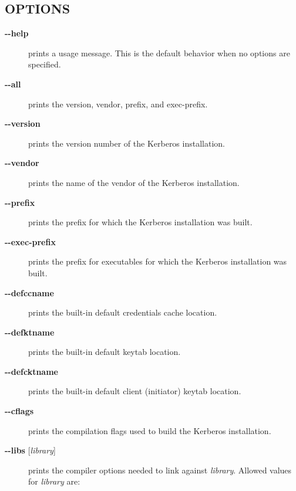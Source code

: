 \documentclass[letterpaper,10pt,english]{sphinxmanual}
\begin{document}
\subsection{OPTIONS}
\label{user/user_commands/krb5-config:options}\begin{description}
\item[{\textbf{-}\textbf{-help}}] \leavevmode
prints a usage message.  This is the default behavior when no options
are specified.

\item[{\textbf{-}\textbf{-all}}] \leavevmode
prints the version, vendor, prefix, and exec-prefix.

\item[{\textbf{-}\textbf{-version}}] \leavevmode
prints the version number of the Kerberos installation.

\item[{\textbf{-}\textbf{-vendor}}] \leavevmode
prints the name of the vendor of the Kerberos installation.

\item[{\textbf{-}\textbf{-prefix}}] \leavevmode
prints the prefix for which the Kerberos installation was built.

\item[{\textbf{-}\textbf{-exec-prefix}}] \leavevmode
prints the prefix for executables for which the Kerberos installation
was built.

\item[{\textbf{-}\textbf{-defccname}}] \leavevmode
prints the built-in default credentials cache location.

\item[{\textbf{-}\textbf{-defktname}}] \leavevmode
prints the built-in default keytab location.

\item[{\textbf{-}\textbf{-defcktname}}] \leavevmode
prints the built-in default client (initiator) keytab location.

\item[{\textbf{-}\textbf{-cflags}}] \leavevmode
prints the compilation flags used to build the Kerberos installation.

\item[{\textbf{-}\textbf{-libs} {[}\emph{library}{]}}] \leavevmode
prints the compiler options needed to link against \emph{library}.
Allowed values for \emph{library} are:

\begin{tabulary}{\linewidth}{|L|L|}
\hline


\end{tabulary}
\end{description}
\end{document}
